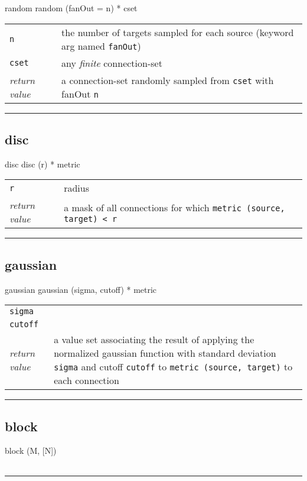 \documentclass[a4paper,twoside]{report}
\makeatletter
\newenvironment{parameters}%
{\begin{tabular}{@{\hspace{2em}}lp{0.6\textwidth}}}%
{\end{tabular}\par\vspace{1mm}\par\hrule\par\vspace{5mm}}
\newcommand{\fa}[1]{\lstinline|#1|}
\newcommand{\expr}[1]{\lstinline|#1|}
\newcommand{\ret}{\emph{return value}}
\makeatother
\begin{document}
\begin{head}{random}
  random (fanOut = n) * cset
\end{head}
\begin{parameters}
  \lstinline|n| &%
  the number of targets sampled for each source (keyword arg named \fa{fanOut})\\
  \fa{cset} &%
  any \emph{finite} connection-set\\
  \ret &%
  a connection-set randomly sampled from \fa{cset} with fanOut \fa{n}\\
\end{parameters}

\subsection{disc}

\begin{head}{disc}
  disc (r) * metric
\end{head}
\begin{parameters}
  \fa{r} & radius \\
  \ret & a mask of all connections for which
  \expr{metric (source, target) < r} \\
\end{parameters}

\subsection{gaussian}

\begin{head}{gaussian}
  gaussian (sigma, cutoff) * metric
\end{head}
\begin{parameters}
  \lstinline|sigma| &%
  \\
  \lstinline|cutoff| &%
  \\
  \ret & a value set associating the result of applying the normalized
  gaussian function with standard deviation \fa{sigma} and cutoff
  \fa{cutoff} to \expr{metric (source, target)} to each connection\\
\end{parameters}

\subsection{block}

\begin{head}{}
  block (M, [N])
\end{head}
\begin{parameters}
\end{parameters}
\end{document}

